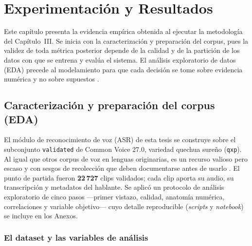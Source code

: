 \section{Experimentaci\'on y Resultados}
\label{cap:experimentacion}

Este cap{\'i}tulo presenta la evidencia emp{\'i}rica obtenida al ejecutar la metodolog{\'i}a
del Cap{\'i}tulo~III. Se inicia con la caracterizaci{\'o}n y preparaci{\'o}n del corpus,
pues la validez de toda m{\'e}trica posterior depende de la calidad y de la partici{\'o}n
de los datos con que se entrena y eval{\'u}a el sistema. El an{\'a}lisis exploratorio de
datos (EDA) precede al modelamiento para que cada decisi{\'o}n se tome sobre evidencia
num{\'e}rica y no sobre supuestos \parencite{hernandez2018metodologia}.

\subsection{Caracterizaci\'on y preparaci\'on del corpus (EDA)}
\label{sec:eda}

El m{\'o}dulo de reconocimiento de voz (ASR) de esta tesis se construye sobre el
subconjunto \texttt{validated} de Common Voice 27.0, variedad quechua sure{\~n}o
(\texttt{qxp}). Al igual que otros corpus de voz en lenguas originarias, es un recurso
valioso pero escaso y con sesgos de recolecci{\'o}n que deben documentarse antes de usarlo
\parencite{zevallos2022huqariq}. El punto de partida fueron \textbf{22\,727} clips
validados; cada clip aporta su audio, su transcripci{\'o}n y metadatos del hablante. Se
aplic{\'o} un protocolo de an{\'a}lisis exploratorio de cinco pasos ---primer vistazo,
calidad, anatom{\'i}a num{\'e}rica, correlaciones y variable objetivo--- cuyo detalle
reproducible (\emph{scripts} y \emph{notebook}) se incluye en los Anexos.

\subsubsection{El dataset y las variables de an\'alisis}
\label{sec:eda-variables}

